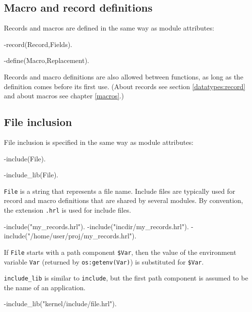 \subsection{Macro and record definitions}

Records and macros are defined in the same way as module attributes:

\begin{erlang}
-record(Record,Fields).

-define(Macro,Replacement).
\end{erlang}

Records and macro definitions are also allowed between functions, as
long as the definition comes before its first use. (About records see
section \ref{datatypes:record} and about macros see chapter \ref{macros}.)

\subsection{File inclusion}

File inclusion is specified in the same way as module attributes:

\begin{erlang}
-include(File).

-include_lib(File).
\end{erlang}

\texttt{File} is a string that represents a file name. Include files
are typically used for record and macro definitions that are shared by
several modules. By convention, the extension \texttt{.hrl} is used
for include files.

\begin{erlang}
-include("my_records.hrl").
-include("incdir/my_records.hrl").
-include("/home/user/proj/my_records.hrl").
\end{erlang}

If \texttt{File} starts with a path component \texttt{\$Var}, then the value of
the environment variable \texttt{Var} (returned by
\texttt{os:getenv(Var)}) is substituted for \texttt{\$Var}.


\texttt{include\_lib} is similar to \texttt{include}, but the
first path component is assumed to be the name of an application.

\begin{erlang}
-include_lib("kernel/include/file.hrl").
\end{erlang}

